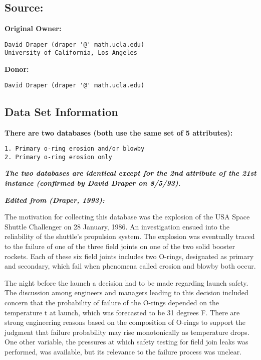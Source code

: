 \documentclass[11pt]{article}
\begin{document}
\hypertarget{source}{%
\subsection{Source:}\label{source}}

\textbf{Original Owner:}

\begin{verbatim}
David Draper (draper '@' math.ucla.edu)
University of California, Los Angeles
\end{verbatim}

\textbf{Donor:}

\begin{verbatim}
David Draper (draper '@' math.ucla.edu)
\end{verbatim}

\hypertarget{data-set-information}{%
\subsection{Data Set Information}\label{data-set-information}}

\textbf{There are two databases (both use the same set of 5
attributes):}

\begin{verbatim}
1. Primary o-ring erosion and/or blowby
2. Primary o-ring erosion only
\end{verbatim}

\textbf{\emph{The two databases are identical except for the 2nd
attribute of the 21st instance (confirmed by David Draper on 8/5/93).}}

\textbf{\emph{Edited from (Draper, 1993):}}

The motivation for collecting this database was the explosion of the USA
Space Shuttle Challenger on 28 January, 1986. An investigation ensued
into the reliability of the shuttle's propulsion system. The explosion
was eventually traced to the failure of one of the three field joints on
one of the two solid booster rockets. Each of these six field joints
includes two O-rings, designated as primary and secondary, which fail
when phenomena called erosion and blowby both occur.

The night before the launch a decision had to be made regarding launch
safety. The discussion among engineers and managers leading to this
decision included concern that the probability of failure of the O-rings
depended on the temperature t at launch, which was forecasted to be 31
degrees F. There are strong engineering reasons based on the composition
of O-rings to support the judgment that failure probability may rise
monotonically as temperature drops. One other variable, the pressures at
which safety testing for field join leaks was performed, was available,
but its relevance to the failure process was unclear.
\end{document}
